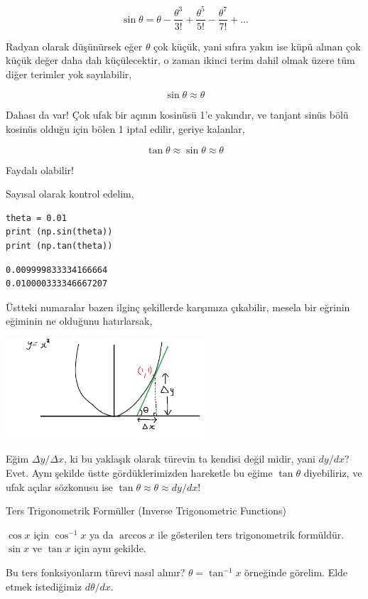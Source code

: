 \documentclass[12pt,fleqn]{article}\usepackage{../../common}
\begin{document}
$$
\sin\theta =
\theta -
\frac{\theta^3}{3!} +
\frac{\theta^5}{5!} -
\frac{\theta^7}{7!} + ...
$$

Radyan olarak düşünürsek eğer $\theta$ çok küçük, yani sıfıra yakın ise küpü
alınan çok küçük değer daha dah küçülecektir, o zaman ikinci terim dahil olmak
üzere tüm diğer terimler yok sayılabilir,

$$
\sin\theta \approx \theta
$$

Dahası da var! Çok ufak bir açının kosinüsü 1'e yakındır, ve tanjant sinüs bölü
kosinüs olduğu için bölen 1 iptal edilir, geriye kalanlar,

$$
\tan\theta \approx \sin\theta \approx \theta
$$

Faydalı olabilir!

Sayısal olarak kontrol edelim,

\begin{verbatim}
theta = 0.01
print (np.sin(theta))
print (np.tan(theta))
\end{verbatim}

\begin{verbatim}
0.009999833334166664
0.010000333346667207
\end{verbatim}

Üstteki numaralar bazen ilginç şekillerde karşımıza çıkabilir, mesela bir
eğrinin eğiminin ne olduğunu hatırlarsak,

\includegraphics[width=20em]{slope_tan2.png}

Eğim $\Delta y / \Delta x$, ki bu yaklaşık olarak türevin ta kendisi değil
midir, yani $dy / dx$? Evet. Aynı şekilde üstte gördüklerimizden hareketle
bu eğime $\tan\theta$ diyebiliriz, ve ufak açılar sözkonusu ise
$\tan\theta \approx \theta \approx dy / dx$!

Ters Trigonometrik Formüller (Inverse Trigonometric Functions)

$\cos x$ için $\cos^{-1} x$ ya da $\arccos x$ ile gösterilen ters
trigonometrik formüldür. $\sin x$ ve $\tan x$ için aynı şekilde. 

Bu ters fonksiyonların türevi nasıl alınır? $\theta = \tan^{-1}x$ örneğinde
görelim. Elde etmek istediğimiz $d\theta/dx$. 
\end{document}
